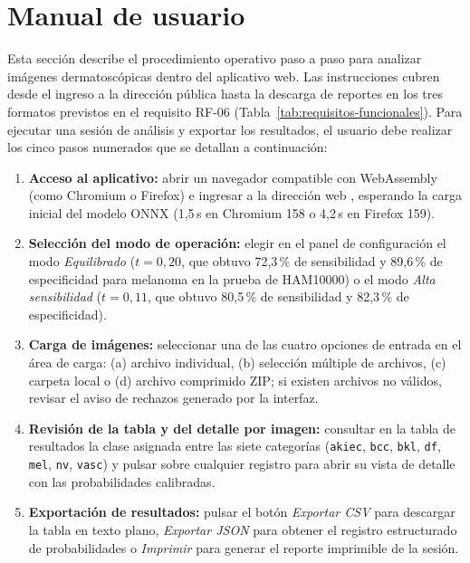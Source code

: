\section{Manual de usuario}

Esta sección describe el procedimiento operativo paso a paso para analizar imágenes dermatoscópicas dentro del aplicativo web. Las instrucciones cubren desde el ingreso a la dirección pública hasta la descarga de reportes en los tres formatos previstos en el requisito RF-06 (Tabla~\ref{tab:requisitos-funcionales}). Para ejecutar una sesión de análisis y exportar los resultados, el usuario debe realizar los cinco pasos numerados que se detallan a continuación:

\begin{enumerate}
  \item \textbf{Acceso al aplicativo:} abrir un navegador compatible con WebAssembly (como Chromium o Firefox) e ingresar a la dirección web , esperando la carga inicial del modelo ONNX (1,5\,s en Chromium 158 o 4,2\,s en Firefox 159).
  \item \textbf{Selección del modo de operación:} elegir en el panel de configuración el modo \textit{Equilibrado} ($t = 0{,}20$, que obtuvo 72,3\,\% de sensibilidad y 89,6\,\% de especificidad para melanoma en la prueba de HAM10000) o el modo \textit{Alta sensibilidad} ($t = 0{,}11$, que obtuvo 80,5\,\% de sensibilidad y 82,3\,\% de especificidad).
  \item \textbf{Carga de imágenes:} seleccionar una de las cuatro opciones de entrada en el área de carga: (a) archivo individual, (b) selección múltiple de archivos, (c) carpeta local o (d) archivo comprimido ZIP; si existen archivos no válidos, revisar el aviso de rechazos generado por la interfaz.
  \item \textbf{Revisión de la tabla y del detalle por imagen:} consultar en la tabla de resultados la clase asignada entre las siete categorías (\texttt{akiec}, \texttt{bcc}, \texttt{bkl}, \texttt{df}, \texttt{mel}, \texttt{nv}, \texttt{vasc}) y pulsar sobre cualquier registro para abrir su vista de detalle con las probabilidades calibradas.
  \item \textbf{Exportación de resultados:} pulsar el botón \textit{Exportar CSV} para descargar la tabla en texto plano, \textit{Exportar JSON} para obtener el registro estructurado de probabilidades o \textit{Imprimir} para generar el reporte imprimible de la sesión.
\end{enumerate}

